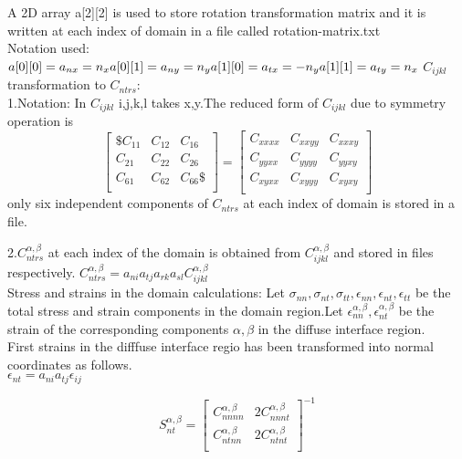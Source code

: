\documentclass[a4paper,12pt]{article}
\begin{document}
A 2D array a[2][2] is used to store rotation transformation matrix and it is written at each index of domain in a file called rotation-matrix.txt\\
Notation used:\\
   $
   a[0][0]=a_{nx}=n_x \\
   a[0][1]=a_{ny}=n_y  \\
   a[1][0]=a_{tx}=-n_y  \\
   a[1][1]=a_{ty}=n_x    \\
   $
$C_{ijkl}$ transformation to $C_{ntrs}$:\\
1.Notation:
In $C_{ijkl}$ i,j,k,l takes  x,y.The reduced form of $C_{ijkl}$ due to symmetry operation is\\
\[
\begin{bmatrix}
\$C_{11} & C_{12} & C_{16} \\
  C_{21} & C_{22} & C_{26} \\
  C_{61} & C_{62} & C_{66} \$ \\  
\end{bmatrix}
=
\begin{bmatrix}
   C_{xxxx} & C_{xxyy} & C_{xxxy} \\
   C_{yyxx} & C_{yyyy} & C_{yyxy}   \\
   C_{xyxx} & C_{xyyy} & C_{xyxy}  \\  
\end{bmatrix} 
\]
only six independent components of $C_{ntrs}$ at each index of domain is stored in a file.

2.$C_{ntrs}^{\alpha,\beta}$ at each index of the domain is obtained from $C_{ijkl}^{\alpha,\beta}$ and stored in files respectively. 
  $C_{ntrs}^{\alpha,\beta}=a_{ni}a_{tj}a_{rk}a_{sl}C_{ijkl}^{\alpha,\beta}$\\
  
 Stress and strains in the domain calculations:
\noindent Let $\sigma_{nn},\sigma_{nt},\sigma_{tt},\epsilon_{nn},\epsilon_{nt},\epsilon_{tt}$ be the total stress and strain components in the domain region.Let $\epsilon_{nn}^{\alpha,\beta},\epsilon_{nt}^{\alpha,\beta}$ be the strain of the corresponding components $\alpha,\beta$ in the diffuse interface region.\\

First strains in the difffuse interface regio has been transformed into normal coordinates as follows.\\
 $\epsilon_{nt}=a_{ni}a_{tj}\epsilon_{ij}$ 
 

 \begin{equation}
  S_{nt}^{\alpha,\beta}=
  \begin{bmatrix}
      C_{nnnn}^{\alpha,\beta} & 2C_{nnnt}^{\alpha,\beta} \\
      C_{ntnn}^{\alpha,\beta} & 2C_{ntnt}^{\alpha,\beta} \\
  \end{bmatrix}^{-1}      
 \end{equation}
 
\end{document}
